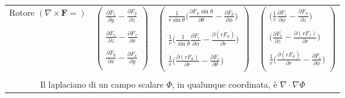 \documentclass{book}
\newcommand{\h}{\mathbf}
\begin{document}
\begin{tabular}{|c|c|c|c|}
    {Rotore $(\nabla\times\h{F}=)$ }
    & {$\left( \begin{array}{c}
         \frac{\partial F_z}{\partial y}-\frac{\partial F_y}{\partial z} \\ \\
         \frac{\partial F_x}{\partial z}-\frac{\partial F_z}{\partial x} \\ \\
         \frac{\partial F_y}{\partial x}-\frac{\partial F_x}{\partial y} \\      
    \end{array} \right) $}
    & {$\left(\begin{array}{c}
        \frac{1}{r \sin \theta} \biggl(\frac{\partial F_\phi \sin\theta}{\partial \theta}-\frac{\partial F_\theta}{\partial \phi}\biggr) \\ \\
        \frac{1}{r}\biggl(\frac{1}{\sin\theta}\frac{\partial F_r}{\partial \phi}-\frac{\partial (r F_\phi)}{\partial r} \biggr) \\ \\
        \frac{1}{r}\biggl(\frac{\partial (r F_\theta)}{\partial r}-\frac{\partial F_r}{\partial \theta}\biggr) \\        
    \end{array}\right) $}
    & {$\left(\begin{array}{c}
        \biggl(\frac{1}{r}\frac{\partial F_z}{\partial \phi}-\frac{\partial F_\phi}{\partial z}\biggr) \\ \\
        \biggl(\frac{\partial F_r}{\partial z}-\frac{\partial (r F_z)}{\partial r} \biggr) \\ \\
        \frac{1}{r}\biggl(\frac{\partial (r F_\phi)}{\partial r}-\frac{\partial F_r}{\partial \phi}\biggr) \\        
    \end{array}\right) $} \\
    & & & \\ \hline
    \multicolumn{4}{|c|}{Il laplaciano di un campo scalare $\Phi$, in qualunque coordinata, è $\nabla\cdot\nabla\Phi$} \\
    \hline
\end{tabular}
\end{document}
